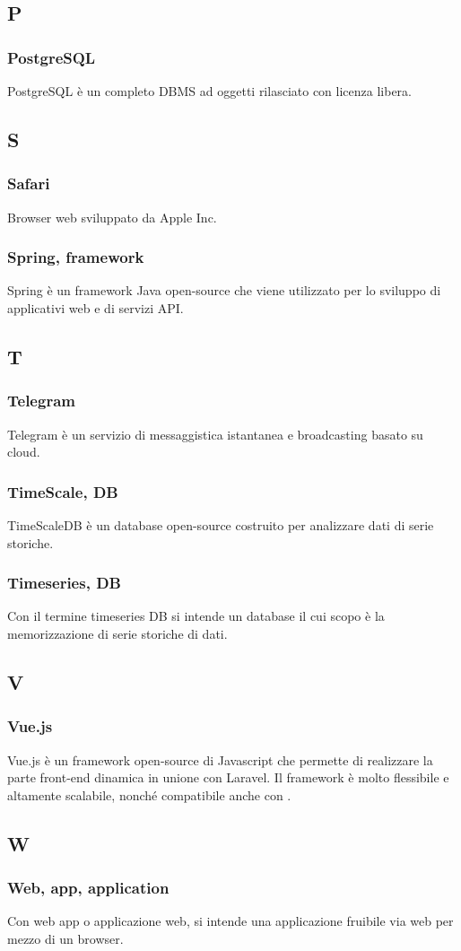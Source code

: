\subsection{P}
\subsubsection{PostgreSQL}  PostgreSQL è un completo DBMS ad oggetti rilasciato con licenza libera.
\subsection{S}
\subsubsection{Safari}
Browser web sviluppato da Apple Inc.
\subsubsection{Spring, framework}  Spring è un framework Java open-source che viene utilizzato per lo sviluppo di applicativi web e di servizi API.
\subsection{T}
\subsubsection{Telegram}  Telegram è un servizio di messaggistica istantanea e broadcasting basato su cloud.
\subsubsection{TimeScale, DB}  TimeScaleDB è un database open-source costruito per analizzare dati di serie storiche.
\subsubsection{Timeseries, DB}  Con il termine timeseries DB si intende un database il cui scopo è la memorizzazione di serie storiche di dati.
\subsection{V}
\subsubsection{Vue.js}  Vue.js è un framework open-source di Javascript che permette di realizzare la parte front-end dinamica in unione con Laravel. Il framework è molto flessibile e altamente scalabile, nonché compatibile anche con .
\subsection{W}
\subsubsection{Web, app, application}
Con web app o applicazione web, si intende una applicazione fruibile via web per mezzo di un browser.